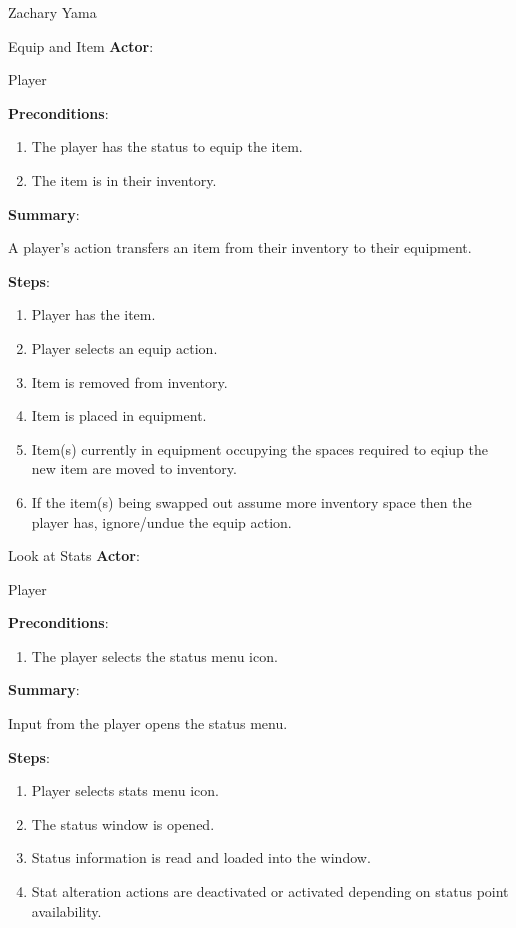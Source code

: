 \documentclass[12pt]{report}
\begin{document}
\begin{section}{Zachary Yama}
\begin{subsection}{Equip and Item}
\textbf{Actor}:

Player

\textbf{Preconditions}:
 
\begin{enumerate}
\item The player has the status to equip the item. 
\item The item is in their inventory.
\end{enumerate}

\textbf{Summary}:

A player's action transfers an item from their inventory to their
equipment.

\textbf{Steps}:

\begin{enumerate}
\item Player has the item.
\item Player selects an equip action.
\item Item is removed from inventory.
\item Item is placed in equipment.
\item Item(s) currently in equipment occupying the spaces required to eqiup
the new item are moved to inventory.
\item If the item(s) being swapped out assume more inventory space then the
player has, ignore/undue the equip action.
\end{enumerate}
\end{subsection}

\begin{subsection}{Look at Stats}
\textbf{Actor}:

Player

\textbf{Preconditions}:

\begin{enumerate}
\item The player selects the status menu icon.
\end{enumerate}

\textbf{Summary}:

Input from the player opens the status menu.

\textbf{Steps}:

\begin{enumerate}
\item Player selects stats menu icon.
\item The status window is opened.
\item Status information is read and loaded into the window.
\item Stat alteration actions are deactivated or activated depending on
status point availability.
\end{enumerate}
\end{subsection}


\end{section}
\end{document}
